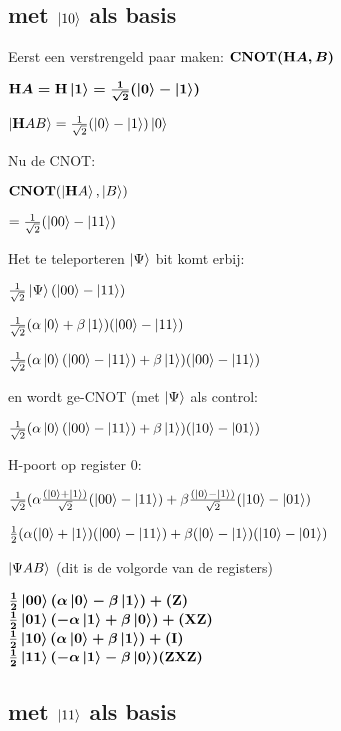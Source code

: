 \documentclass[../main.tex]{subfiles}
\begin{document}
\clearpage

\subsection*{met $\ket{10}$ als basis}
Eerst een verstrengeld paar maken: $\port{CNOT}(\port{H}A, B)$

$\port{H}A=\port{H}\ket{1}=\frac{1}{\sqrt{2}}(\ket{0}-\ket{1})$

$\ket{\port{H}A B}= \frac{1}{\sqrt{2}}(\ket{0}-\ket{1})\ket{0}$

Nu de CNOT:

$\port{CNOT}(\ket{\port{H}A},\ket{ B})$

$ =\frac{1}{\sqrt{2}}(\ket{00}-\ket{11})$

Het te teleporteren $\ket{\Psi}$ bit komt erbij:

$ \frac{1}{\sqrt{2}}\ket{\Psi}(\ket{00}-\ket{11})$

$ \frac{1}{\sqrt{2}}(\alpha\ket{0}+\beta\ket{1})(\ket{00}-\ket{11})$

$ \frac{1}{\sqrt{2}}(\alpha\ket{0}(\ket{00}-\ket{11})+\beta\ket{1})(\ket{00}-\ket{11})$

en wordt ge-CNOT (met $\ket{\Psi}$ als control:

$ \frac{1}{\sqrt{2}}(\alpha\ket{0}(\ket{00}-\ket{11})+\beta\ket{1})(\ket{10}-\ket{01})$

H-poort op register 0:

$ \frac{1}{\sqrt{2}}(\alpha\frac{(\ket{0}+\ket{1})}{\sqrt{2}}(\ket{00}-\ket{11})+\beta\frac{(\ket{0}-\ket{1})}{\sqrt{2}}(\ket{10}-\ket{01})$


$ \frac{1}{2}(\alpha(\ket{0}+\ket{1})(\ket{00}-\ket{11})+\beta(\ket{0}-\ket{1})(\ket{10}-\ket{01})$

$\ket{\Psi A B}$ (dit is de volgorde van de registers)

$\frac{1}{2}\ket{00}(\alpha\ket{0}-\beta\ket{1})+ (\port{Z})$\\
$\frac{1}{2}\ket{01}(-\alpha\ket{1}+\beta\ket{0})+(\port{XZ})$\\
$\frac{1}{2}\ket{10}(\alpha\ket{0}+\beta\ket{1})+ (\port{I})$\\
$\frac{1}{2}\ket{11}(-\alpha\ket{1}-\beta\ket{0}) (\port{ZXZ})$\\

\clearpage

\subsection*{met $\ket{11}$ als basis}
\end{document}
